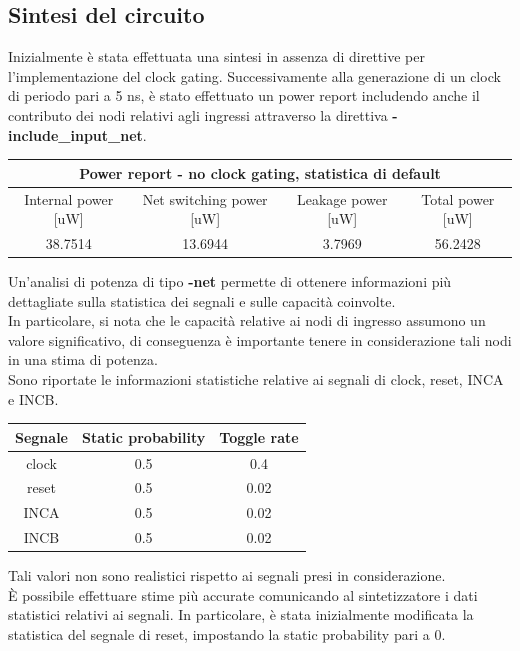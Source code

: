 \documentclass[11pt,  english, makeidx, a4paper, titlepage, oneside]{book}
\begin{document}
\subsection{Sintesi del circuito}
Inizialmente è stata effettuata una sintesi in assenza di direttive per l'implementazione del clock gating.
Successivamente alla generazione di un clock di periodo pari a 5 ns, è stato effettuato un power report includendo anche il contributo dei nodi relativi agli ingressi attraverso la direttiva \textbf{-include\_input\_net}.
\\
\begin{center}
	\begin{tabular}{|c|c|c|c|}
	\hline
	\multicolumn{4}{|c|}{Power report - no clock gating, statistica di default} \\
	\hline
	Internal power [uW] & Net switching power [uW] & Leakage power [uW] & Total power [uW] \\
	\hline
	 38.7514 & 13.6944  &  3.7969  &  56.2428 \\
	\hline
	\end{tabular}	
\end{center}
\vspace{0.3cm}
Un'analisi di potenza di tipo \textbf{-net} permette di ottenere informazioni più dettagliate sulla statistica dei segnali e sulle capacità coinvolte. 
\\
In particolare, si nota che le capacità relative ai nodi di ingresso assumono un valore significativo, di conseguenza è importante tenere in considerazione tali nodi in una stima di potenza.
\\
Sono riportate le informazioni statistiche relative ai segnali di clock, reset, INCA e INCB.
\\
\begin{center}
	\begin{tabular}{|c|c|c|}
	\hline
Segnale & Static probability & Toggle rate \\
	\hline
	 clock & 0.5  &  0.4 \\
	\hline
	 reset & 0.5  &  0.02 \\
	\hline
	 INCA & 0.5  &  0.02 \\
	\hline
	 INCB & 0.5  &  0.02 \\
	\hline
	\end{tabular}	
\end{center}
\vspace{0.3cm}
Tali valori non sono realistici rispetto ai segnali presi in considerazione.
\\
È possibile effettuare stime più accurate comunicando al sintetizzatore i dati statistici relativi ai segnali. In particolare, è stata inizialmente modificata la statistica del segnale di reset, impostando la static probability pari a 0.
\end{document}
